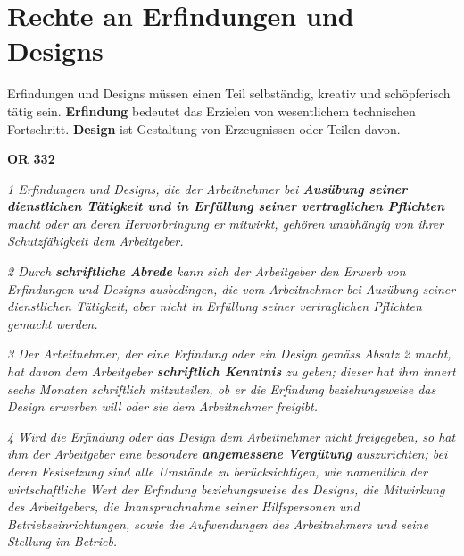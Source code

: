 \section{Rechte an Erfindungen und Designs}

Erfindungen und Designs müssen einen Teil selbständig, kreativ und schöpferisch tätig sein. \textbf{Erfindung} bedeutet das Erzielen von wesentlichem technischen Fortschritt. \textbf{Design} ist Gestaltung von Erzeugnissen oder Teilen davon.

\vspace{3mm}
\textbf{OR 332}

\textit{1 Erfindungen und Designs, die der Arbeitnehmer bei \textbf{Ausübung seiner dienstlichen Tätigkeit und in Erfüllung seiner vertraglichen Pflichten} macht oder an deren Hervorbringung er mitwirkt, gehören unabhängig von ihrer Schutzfähigkeit dem Arbeitgeber.}

\textit{2 Durch \textbf{schriftliche Abrede} kann sich der Arbeitgeber den Erwerb von Erfindungen und Designs ausbedingen, die vom Arbeitnehmer bei Ausübung seiner dienstlichen Tätigkeit, aber nicht in Erfüllung seiner vertraglichen Pflichten gemacht werden.}

\textit{3 Der Arbeitnehmer, der eine Erfindung oder ein Design gemäss Absatz 2 macht, hat davon dem Arbeitgeber \textbf{schriftlich Kenntnis} zu geben; dieser hat ihm innert sechs Monaten schriftlich mitzuteilen, ob er die Erfindung beziehungsweise das Design erwerben will oder sie dem Arbeitnehmer freigibt.}

\textit{4 Wird die Erfindung oder das Design dem Arbeitnehmer nicht freigegeben, so hat ihm der Arbeitgeber eine besondere \textbf{angemessene Vergütung} auszurichten; bei deren Festsetzung sind alle Umstände zu berücksichtigen, wie namentlich der wirtschaftliche Wert der Erfindung beziehungsweise des Designs, die Mitwirkung des Arbeitgebers, die Inanspruchnahme seiner Hilfspersonen und Betriebseinrichtungen, sowie die Aufwendungen des Arbeitnehmers und seine Stellung im Betrieb.}

